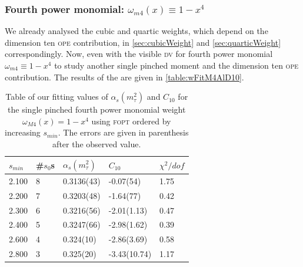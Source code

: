\documentclass[../../index.tex]{subfiles}
\begin{document}
\subsubsection{Fourth power monomial: \(\omega_{m4}(x) \equiv 1-x^4\)}
We already analysed the cubic and quartic weights, which depend on the dimension
ten \textsc{ope} contribution, in \cref{sec:cubicWeight} and
\cref{sec:quarticWeight} correspondingly. Now, even with the visible \textsc{dv}
for fourth power monomial \(\omega_{m4}\equiv 1-x^4\) to study another single
pinched moment and the dimension ten \textsc{ope} contribution. The results of
the are given in \cref{table:wFitM4AlD10}.
\begin{table}
  \centering
  \begin{tabular}{lllll}
    \toprule
    \(s_{min}\) & \#\(s_0\)s & \(\alpha_s(m_\tau^2)\) & \(C_{10}\) & \(\chi^2/dof\)  \\
    \midrule
    2.100 & 8  & 0.3136(43) & -0.07(54) & 1.75 \\
    \rowcolor{primary}
    2.200 & 7  & 0.3203(48) & -1.64(77) & 0.42 \\
    \rowcolor{primary}
    2.300 & 6  & 0.3216(56) & -2.01(1.13) & 0.47 \\
    \rowcolor{primary}
    2.400 & 5  & 0.3247(66) & -2.98(1.62) & 0.39 \\
    \rowcolor{primary}
    2.600 & 4  & 0.324(10) & -2.86(3.69) & 0.58 \\
    2.800 & 3  & 0.325(20) & -3.43(10.74) & 1.17 \\
    \bottomrule
  \end{tabular}
  \caption{Table of our fitting values of \(\alpha_s(m_\tau^2)\) and \(C_{10}\)
    for the single pinched fourth power monomial weight \(\omega_{M4}(x)=1-x^4\)
    using \textsc{fopt} ordered by increasing \(s_{min}\). The errors are given
    in parenthesis after the observed value.}
  \label{table:fitM4AlD10}
\end{table}
\end{document}
